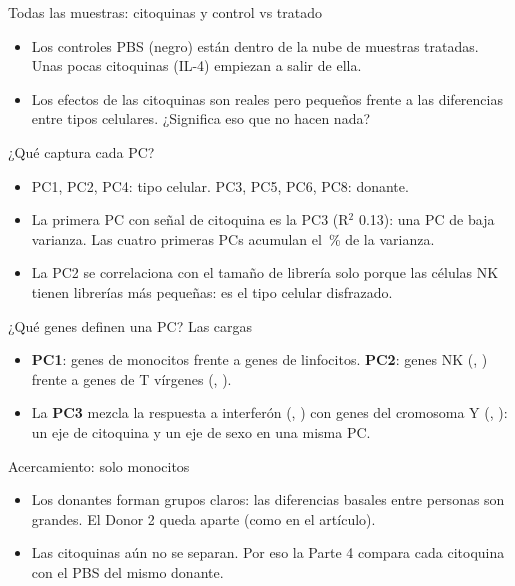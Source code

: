 \begin{frame}{Todas las muestras: citoquinas y control vs tratado}
  \centering
  \begin{itemize}\small\setlength\itemsep{2pt}
    \item Los controles PBS (negro) están \alert{dentro} de la nube de muestras tratadas. Unas pocas citoquinas (IL-4) empiezan a salir de ella.
    \item Los efectos de las citoquinas son reales pero \alert{pequeños frente a las diferencias entre tipos celulares}. ¿Significa eso que no hacen nada?
  \end{itemize}
\end{frame}

\begin{frame}{¿Qué captura cada PC?}
  \centering
  \begin{itemize}\small\setlength\itemsep{2pt}
    \item PC1, PC2, PC4: \alert{tipo celular}. PC3, PC5, PC6, PC8: \alert{donante}.
    \item La primera PC con señal de citoquina es la PC3 (R$^2$ 0.13): una PC de baja varianza. Las cuatro primeras PCs acumulan el \numpcafirstfour\,\% de la varianza.
    \item La PC2 se correlaciona con el tamaño de librería solo porque las células NK tienen librerías más pequeñas: es el tipo celular disfrazado.
  \end{itemize}
\end{frame}

\begin{frame}{¿Qué genes definen una PC? Las cargas}
  \centering
  \begin{itemize}\small\setlength\itemsep{2pt}
    \item \textbf{PC1}: genes de monocitos frente a genes de linfocitos. \textbf{PC2}: genes NK (, ) frente a genes de T vírgenes (, ).
    \item La \textbf{PC3} mezcla la \alert{respuesta a interferón} (, ) con \alert{genes del cromosoma Y} (, ): un eje de citoquina y un eje de sexo en una misma PC.
  \end{itemize}
\end{frame}

\begin{frame}{Acercamiento: solo monocitos}
  \centering
  \begin{itemize}\small\setlength\itemsep{2pt}
    \item Los \alert{donantes} forman grupos claros: las diferencias basales entre personas son grandes. El Donor 2 queda aparte (como en el artículo).
    \item Las citoquinas aún no se separan. Por eso la Parte 4 compara cada citoquina con el PBS del \alert{mismo donante}.
  \end{itemize}
\end{frame}

